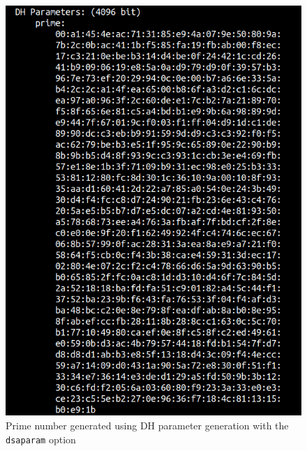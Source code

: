 \documentclass[a4paper]{article}
\begin{document}
\begin{appendices}
\begin{figure}[H]
    \centering
    \includegraphics[width=.8\textwidth]{img/dsa-prime.png}
    \caption{Prime number generated using DH parameter generation with the \texttt{dsaparam} option}
    \label{fig:dsa-prime}
\end{figure}


\end{appendices}
\end{document}
